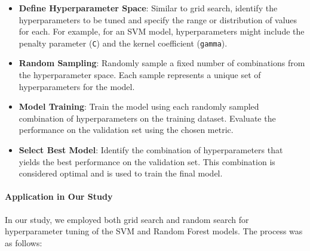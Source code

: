 \begin{itemize}
    \item \textbf{Define Hyperparameter Space}: Similar to grid search, identify the hyperparameters to be tuned and specify the range or distribution of values for each. For example, for an SVM model, hyperparameters might include the penalty parameter (\texttt{C}) and the kernel coefficient (\texttt{gamma}).
    \item \textbf{Random Sampling}: Randomly sample a fixed number of combinations from the hyperparameter space. Each sample represents a unique set of hyperparameters for the model.
    \item \textbf{Model Training}: Train the model using each randomly sampled combination of hyperparameters on the training dataset. Evaluate the performance on the validation set using the chosen metric.
    \item \textbf{Select Best Model}: Identify the combination of hyperparameters that yields the best performance on the validation set. This combination is considered optimal and is used to train the final model.
\end{itemize}

\paragraph{Application in Our Study}

In our study, we employed both grid search and random search for hyperparameter tuning of the SVM and Random Forest models. The process was as follows:


